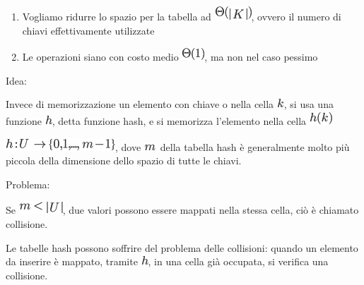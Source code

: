 \documentclass{article}
\providecommand{\tightlist}{%
  \setlength{\itemsep}{0pt}\setlength{\parskip}{0pt}}
\begin{document}
\begin{enumerate}
\tightlist
\item
  {Vogliamo ridurre lo spazio per la tabella ad
  }\includegraphics{images/image232.png}{, ovvero il numero di chiavi
  effettivamente utilizzate}
\item
  {Le operazioni siano con costo medio
  }\includegraphics{images/image69.png}{, ma non nel caso pessimo}
\end{enumerate}

{}

{Idea:}

{Invece di memorizzazione un elemento con chiave o nella cella
}\includegraphics{images/image118.png}{, si usa una funzione
}\includegraphics{images/image89.png}{, detta funzione hash, e si
memorizza l'elemento nella cella }\includegraphics{images/image233.png}

{}

\includegraphics{images/image234.png}{, dove
}\includegraphics{images/image235.png}{~della tabella hash è
generalmente molto più piccola della dimensione dello spazio di tutte le
chiavi.}

{}

{Problema: }

{Se }\includegraphics{images/image236.png}{, due valori possono essere
mappati nella stessa cella, ciò è chiamato collisione. }

{}

{Le tabelle hash possono soffrire del problema delle collisioni: quando
un elemento da inserire è mappato, tramite
}\includegraphics{images/image89.png}{, in una cella già occupata, si
verifica una collisione.}
\end{document}

